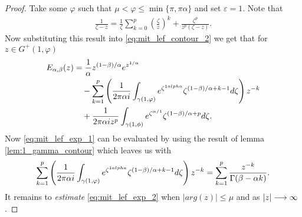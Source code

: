 \begin{proof}
    Take some $ \varphi $ such that $ \mu < \varphi \leq \min\{\pi,\pi\alpha\} $ and set
    $ \varepsilon  = 1 $.
    Note that 
    \begin{align}
        \label{eq:geometric_expansion}
        \frac{1}{\zeta - z} = \frac{1}{\zeta}\sum_{k=0}^p \left( \frac{\zeta}{z}\right)^k + \frac{\zeta^p}{z^p(\zeta - z)}.
    \end{align}
    Now substituting this result into \eqref{eq:mit_lef_contour_2}
    we get that for $ z \in G^+(1, \varphi) $
    \begin{align}
        E_{\alpha, \beta}(z) &= \frac{1}{\alpha} z^{(1-\beta)/\alpha} e^{z^{1 / \alpha}} \\
        \label{eq:mit_lef_exp_1}    
        & \ \ \ - \sum_{k=1}^p \left( \frac{1}{2\pi\alpha i} \int_{\gamma(1,\varphi)} e^{\zeta^{1\/alpha}} \zeta^{(1-\beta)/\alpha + k - 1} d\zeta \right) z^{-k}  \\ 
        \label{eq:mit_lef_exp_2}
            & \ \ \ + \frac{1}{2\pi\alpha i z^p} \int_{\gamma(1,\phi)} e^{\zeta^{\alpha / 1}} \zeta^{(1-\beta)/\alpha + p} d\zeta.
    \end{align}
    Now \eqref{eq:mit_lef_exp_1} can be evaluated by using the result of lemma \ref{lem:1_gamma_contour} which leaves us with 
    \begin{align}
        \label{eq:mit_lef_asym_sum_1}
        \sum_{k=1}^p \left( \frac{1}{2\pi\alpha i} \int_{\gamma(1,\varphi)} e^{\zeta^{1\/alpha}} \zeta^{(1-\beta)/\alpha + k - 1} d\zeta \right) z^{-k} = \sum_{k=1}^p \frac{z^{-k}}{\Gamma(\beta - \alpha k)}.
    \end{align}
    It remains to \emph{estimate} \eqref{eq:mit_lef_exp_2} when $ |arg(z)| \leq \mu $ and as $ |z| \longrightarrow \infty $. 
    

\end{proof}
